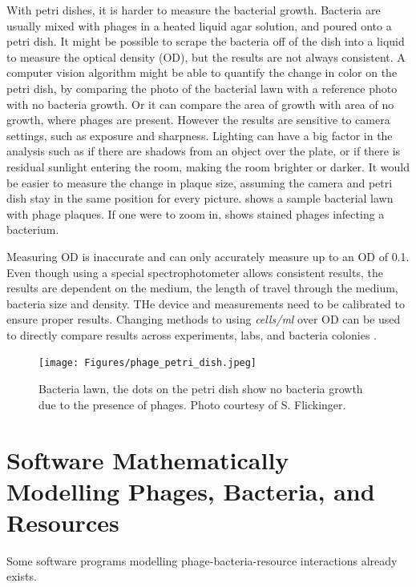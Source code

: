 With petri dishes, it is harder to measure the bacterial growth. 
Bacteria are usually mixed with phages in a heated liquid agar solution, and poured onto a petri dish. 
It might be possible to scrape the bacteria off of the dish into a liquid to measure the optical density (OD), but the results are not always consistent. 
A computer vision algorithm might be able to quantify the change in color on the petri dish, by comparing the photo of the bacterial lawn with a reference photo with no bacteria growth. 
Or it can compare the area of growth with area of no growth, where phages are present. 
However the results are sensitive to camera settings, such as exposure and sharpness. 
Lighting can have a big factor in the analysis such as if there are shadows from an object over the plate, or if there is residual sunlight entering the room, making the room brighter or darker. 
It would be easier to measure the change in plaque size, assuming the camera and petri dish stay in the same position for every picture. 
 shows a sample bacterial lawn with phage plaques. 
If one were to zoom in,  shows stained phages infecting a bacterium. 

Measuring OD is inaccurate and can only accurately measure up to an OD of 0.1. Even though using a special spectrophotometer allows consistent results, the results are dependent on the medium, the length of travel through the medium, bacteria size and density. 
THe device and measurements need to be calibrated to ensure proper results. 
Changing methods to using \textit{cells/ml} over OD can be used to directly compare results across experiments, labs, and bacteria colonies \cite{miraEstimatingMicrobialPopulation2022}. 



\begin{figure}[h!]
    \texttt{[image: Figures/phage\_petri\_dish.jpeg]}
    \centering
    \caption{Bacteria lawn, the dots on the petri dish show no bacteria growth due to the presence of phages. Photo courtesy of S. Flickinger. }
    \label{fig:phage_petri_dish}
\end{figure}


\section{Software Mathematically Modelling Phages, Bacteria, and Resources}
Some software programs modelling phage-bacteria-resource interactions already exists. 

